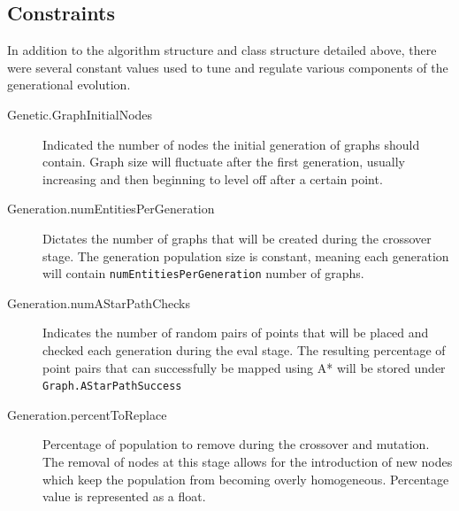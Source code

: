 	\subsection{Constraints}
	In addition to the algorithm structure and class structure detailed above, there were several constant values used to tune and regulate various components of the generational evolution.
	\begin{description}
		\item[Genetic.GraphInitialNodes] Indicated the number of nodes the initial generation of graphs should contain. Graph size will fluctuate after the first generation, usually increasing and then beginning to level off after a certain point.
		\item[Generation.numEntitiesPerGeneration] Dictates the number of graphs that will be created during the crossover stage. The generation population size is constant, meaning each generation will contain \texttt{numEntitiesPerGeneration} number of graphs.
		\item[Generation.numAStarPathChecks] Indicates the number of random pairs of points that will be placed and checked each generation during the eval stage. The resulting percentage of point pairs that can successfully be mapped using A* will be stored under \texttt{Graph.AStarPathSuccess}
		\item[Generation.percentToReplace] Percentage of population to remove during the crossover and mutation. The removal of nodes at this stage allows for the introduction of new nodes which keep the population from becoming overly homogeneous. Percentage value is represented as a float.
	\end{description}
	
